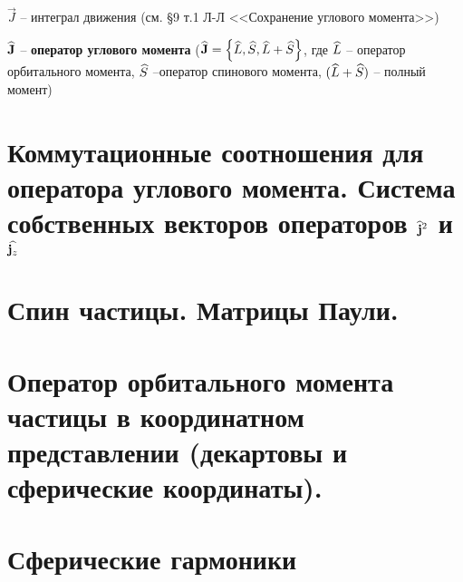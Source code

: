 $\vec{J}$ -- интеграл движения (см. \S 9 т.1 Л-Л <<Сохранение углового момента>>)

$\widehat{\mathbf{J}}$ -- \textbf{оператор углового момента} ($\widehat{\mathbf{J}} = \left\{ {\widehat{L}, \widehat{S}, \widehat{L}+\widehat{S}} \right\}$, где $\widehat{L}$ -- оператор орбитального момента, $\widehat{S}$ --оператор спинового момента, $(\widehat{L} + \widehat{S})$ -- полный момент)


\section{Коммутационные соотношения для оператора углового момента. Система собственных векторов операторов $\widehat{\mathbf{j}}^2$ и $\widehat{\mathbf{j}_z}$}


\section{Спин частицы. Матрицы Паули.}


\section{Оператор орбитального момента частицы в координатном представлении (декартовы и сферические координаты).}


\section{Сферические гармоники}